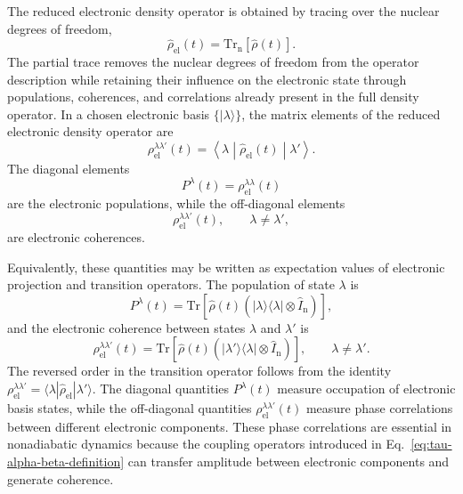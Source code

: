 \documentclass[
  11pt,
  letterpaper,
  onehalfspacing,
  normalmargins,
  equalmargins,
  oneside
]{ut-thesis}
\begin{document}
The reduced electronic density operator is obtained by tracing over the nuclear
degrees of freedom,
\begin{equation}
\hat\rho_{\mathrm{el}}(t)
=
\mathrm{Tr}_{\mathrm n}
\left[
\hat\rho(t)
\right].
\label{eq:reduced-electronic-density-operator}
\end{equation}
The partial trace removes the nuclear degrees of freedom from the operator
description while retaining their influence on the electronic state through
populations, coherences, and correlations already present in the full density
operator. In a chosen electronic basis \(\{|\lambda\rangle\}\), the matrix elements
of the reduced electronic density operator are
\begin{equation}
\rho_{\mathrm{el}}^{\lambda\lambda'}(t)
=
\left\langle
\lambda
\middle|
\hat\rho_{\mathrm{el}}(t)
\middle|
\lambda'
\right\rangle .
\label{eq:reduced-electronic-density-matrix-elements}
\end{equation}
The diagonal elements
\begin{equation}
P^\lambda(t)
=
\rho_{\mathrm{el}}^{\lambda\lambda}(t)
\label{eq:electronic-population-density-matrix}
\end{equation}
are the electronic populations, while the off-diagonal elements
\begin{equation}
\rho_{\mathrm{el}}^{\lambda\lambda'}(t),
\qquad
\lambda\neq\lambda',
\label{eq:electronic-coherence-density-matrix}
\end{equation}
are electronic coherences.

Equivalently, these quantities may be written as expectation values of
electronic projection and transition operators. The population of state \(\lambda\)
is
\begin{equation}
P^\lambda(t)
=
\mathrm{Tr}
\left[
\hat\rho(t)
\left(
|\lambda\rangle\langle \lambda|
\otimes
\hat I_{\mathrm n}
\right)
\right],
\label{eq:population-projector-definition}
\end{equation}
and the electronic coherence between states \(\lambda\) and \(\lambda'\) is
\begin{equation}
\rho_{\mathrm{el}}^{\lambda\lambda'}(t)
=
\mathrm{Tr}
\left[
\hat\rho(t)
\left(
|\lambda'\rangle\langle \lambda|
\otimes
\hat I_{\mathrm n}
\right)
\right],
\qquad
\lambda\neq\lambda' .
\label{eq:electronic-coherence-definition}
\end{equation}
The reversed order in the transition operator follows from the identity
\(\rho_{\mathrm{el}}^{\lambda\lambda'}
=
\langle \lambda|\hat\rho_{\mathrm{el}}|\lambda'\rangle\). The diagonal quantities
\(P^\lambda(t)\) measure occupation of electronic basis states, while the
off-diagonal quantities \(\rho_{\mathrm{el}}^{\lambda\lambda'}(t)\) measure phase
correlations between different electronic components. These phase correlations
are essential in nonadiabatic dynamics because the coupling operators
introduced in Eq.~\eqref{eq:tau-alpha-beta-definition} can transfer amplitude
between electronic components and generate coherence.
\end{document}
